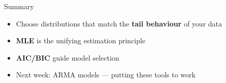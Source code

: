 \documentclass[aspectratio=169, 10pt]{beamer}
\begin{document}
\begin{frame}{Summary}
\begin{itemize}
    \item Choose distributions that match the \textbf{tail behaviour} of your data
    \item \textbf{MLE} is the unifying estimation principle
    \item \textbf{AIC/BIC} guide model selection
    \item Next week: \alert{ARMA models} --- putting these tools to work
\end{itemize}
\end{frame}
\end{document}
